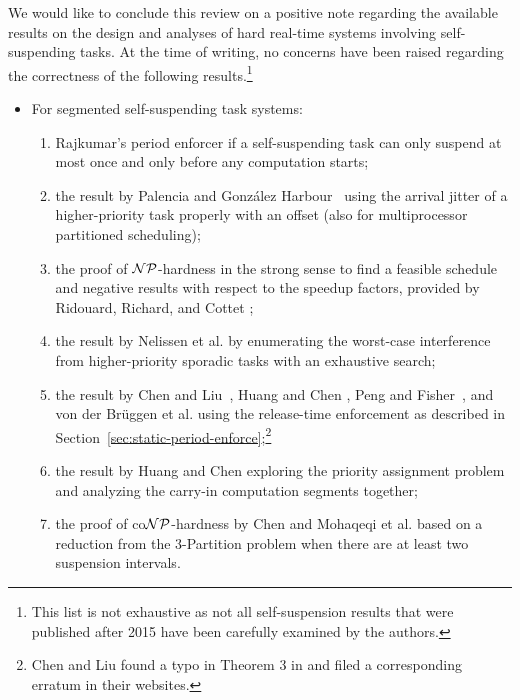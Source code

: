 We would like to conclude this review on a  positive note regarding the available results on the design and analyses of hard real-time systems
involving self-suspending tasks.  At the time of writing, no concerns have been raised regarding the correctness of the
following results.\footnote{This list is not exhaustive as not all self-suspension results that were published after 2015 have been carefully examined by the authors.} %
\begin{itemize}
\item For segmented self-suspending task systems: 
  \begin{enumerate}
  \item Rajkumar's period enforcer \cite{Raj:suspension1991}
    if a self-suspending task
    can only suspend at most once and only before any computation starts;
  \item the result by Palencia and Gonz\'alez
    Harbour~\cite{PH:rtss98} using the arrival jitter of a
    higher-priority task properly with an offset (also for
    multiprocessor partitioned scheduling);
  \item the proof of ${\cal NP}$-hardness in the strong sense to find a feasible
    schedule and negative results with respect to the speedup factors,
    provided by Ridouard, Richard, and Cottet \cite{Ridouard_2004};
  \item the result by Nelissen et al. \cite{ecrts15nelissen} by
    enumerating the worst-case interference from higher-priority
    sporadic tasks with an exhaustive search;
  \item the result by Chen and Liu~\cite{RTSS-ChenL14}, Huang and
    Chen \cite{WC16-suspend-DATE}, Peng and Fisher~\cite{Peng-Fisher-RTCSA2016}, 
    and von der Br\"uggen et al. \cite{Bruggen16RTNS} using the release-time
    enforcement as described in
    Section~\ref{sec:static-period-enforce};\footnote{Chen and Liu
      found a typo in Theorem 3 in \cite{RTSS-ChenL14}
      and filed a corresponding erratum in their websites.}
  \item the result by Huang and Chen \cite{Huang:multiseg}
    exploring the priority assignment problem and analyzing the
    carry-in computation segments together;
 \item the proof of co${\cal NP}$-hardness by Chen
   \cite{RTSS2016-suspension} and Mohaqeqi et al. \cite{DBLP:conf/rtns/MohaqeqiE016} based on
   a reduction from the 3-Partition problem when there are at least two suspension intervals.
  \end{enumerate}

\end{itemize}
